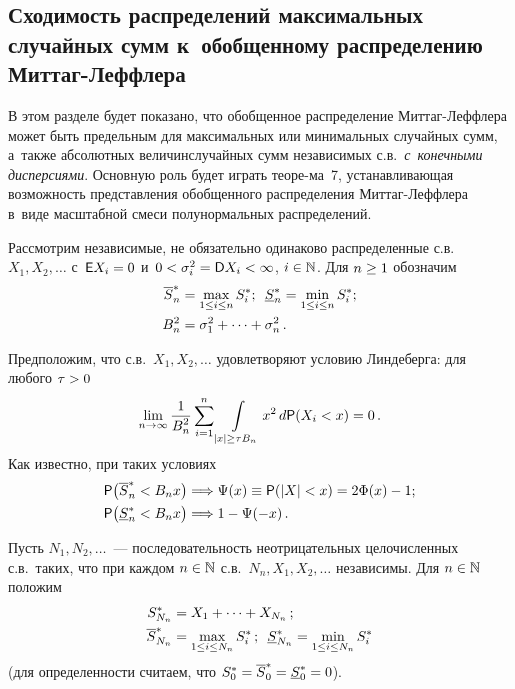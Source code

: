 \begin{multicols}{2}
\vspace*{-6pt}

\section{Сходимость распределений максимальных случайных сумм 
к~обобщенному распределению Миттаг-Леффлера}

В этом разделе будет
показано, что обобщенное распределение Мит\-таг-Леф\-фле\-ра может быть
предельным для максимальных или минимальных\linebreak
 случайных сумм, а~также
абсолютных величин\linebreak случайных сумм независимых с.в.\ \textit{с~конечными\linebreak
дис\-пер\-си\-ями}. Основную роль будет играть теоре-\linebreak ма~7,
 уста\-нав\-ли\-ва\-ющая
возможность представления обобщен\-но\-го распределения Мит\-таг-Леф\-фле\-ра
в~виде масштабной смеси полунормальных распределений.

Рассмотрим независимые, не обязательно одинаково распределенные с.в.\
 $X_1,X_2,\ldots $ с~${\sf E}X_i\hm=0$ и~$0\hm<\sigma^2_i\hm=
 {\sf D}X_i\hm<\infty$, $i\hm\in\mathbb{N}$. Для $n\hm\ge1$ обозначим 
\begin{align*}
 \overline S^*_n&=\max\limits_{1\le i\le n}S^*_i;\enskip 
 \underline S^*_n=\min\limits_{1\le i\le
n}S^*_i;\\
B_n^2&=\sigma_1^2+\cdots+\sigma_n^2\,.
\end{align*}

Предположим, что с.в.\
 $X_1,X_2,\ldots $ удовлетворяют условию Линдеберга: для любого
$\tau\hm>0$
\begin{equation}
\lim\limits_{n\to\infty}\displaystyle\frac{\displaystyle 1\mathstrut}{\displaystyle B^2_n\mathstrut}\sum\limits_{i=1}^{n}\int\limits_{|x|\ge\tau
B_n} x^2\,d{\sf P}(X_i<x)=0\,.\label{e17-kgz}
\end{equation}
Как известно, при таких условиях 
\begin{align*}
{\sf P}\big(\overline S^*_n<B_nx\big)&\Longrightarrow \Psi(x)\equiv{\sf P}
(|X|<x)=2\Phi(x)-1;\\
{\sf P}\big(\underline
S^*_n<B_nx\big)&\Longrightarrow 1-\Psi(-x)\,.
\end{align*}

Пусть $N_1,N_2,\ldots $~--- последовательность неотрицательных
целочисленных с.в.\ таких, что при каж\-дом $n\hm\in\mathbb{N}$ с.в.\
$N_n,X_1,X_2,\ldots $ независимы. Для $n\hm\in\mathbb{N}$ положим
\begin{align*}
S^*_{N_n}&=X_1+\cdots +X_{N_n}\,;\\
\overline S^*_{N_n}&= \max\limits_{1\le i\le N_n}S_i^*\,;\enskip 
\underline S^*_{N_n}\hm=\min\limits_{1\le i\le N_n}S_i^*
\end{align*}
(для определенности считаем, что $S^*_0\hm=\overline S^*_0\hm=\underline
S^*_0\hm=0$). 


\end{multicols}
